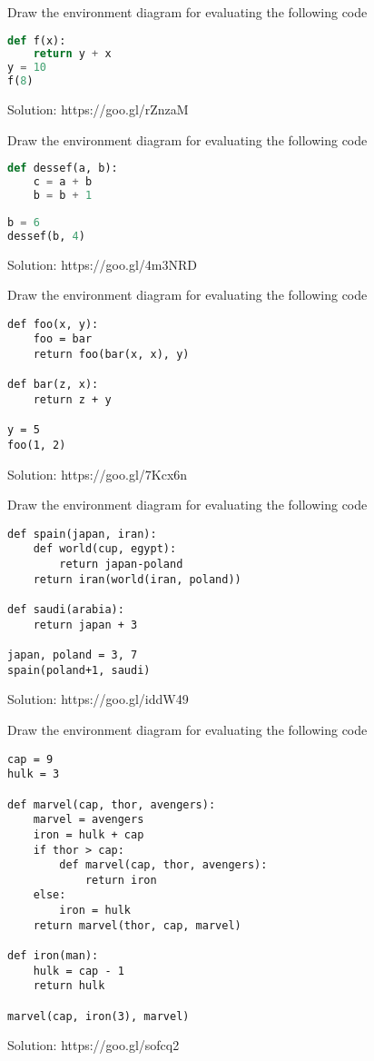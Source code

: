 \question
Draw the environment diagram for evaluating the following code
\begin{lstlisting}[language=Python]
def f(x):
    return y + x
y = 10
f(8)
\end{lstlisting}

\begin{solution}[3in]
Solution: https://goo.gl/rZnzaM
\end{solution}

\question
Draw the environment diagram for evaluating the following code
\begin{lstlisting}[language=Python]
def dessef(a, b):
	c = a + b
	b = b + 1
	    
b = 6
dessef(b, 4)
\end{lstlisting}

\begin{solution}[3in]
Solution: https://goo.gl/4m3NRD
\end{solution}
\newpage
\question
Draw the environment diagram for evaluating the following code
\begin{lstlisting}
def foo(x, y):
	foo = bar
	return foo(bar(x, x), y)
	
def bar(z, x):
	return z + y
	
y = 5
foo(1, 2)
\end{lstlisting}
\begin{solution}[2.5in]
Solution: 	https://goo.gl/7Kcx6n
\end{solution}

\question
Draw the environment diagram for evaluating the following code
\begin{lstlisting}
def spain(japan, iran):
	def world(cup, egypt):
		return japan-poland
	return iran(world(iran, poland))

def saudi(arabia):
	return japan + 3
	
japan, poland = 3, 7
spain(poland+1, saudi)
\end{lstlisting}
\begin{solution}
Solution: 	https://goo.gl/iddW49
\end{solution}
\newpage

\question
Draw the environment diagram for evaluating the following code
\begin{lstlisting}
cap = 9
hulk = 3

def marvel(cap, thor, avengers):
    marvel = avengers
    iron = hulk + cap
    if thor > cap:
        def marvel(cap, thor, avengers):
            return iron
    else:
        iron = hulk      
    return marvel(thor, cap, marvel)

def iron(man):
    hulk = cap - 1
    return hulk

marvel(cap, iron(3), marvel)
\end{lstlisting}
\begin{solution}
Solution:	https://goo.gl/sofcq2
\end{solution}
